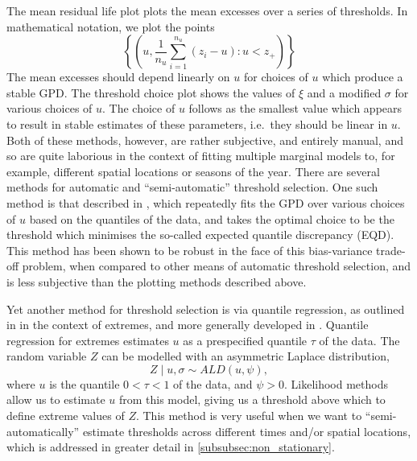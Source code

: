 \documentclass{article}
\numberwithin{equation}{section}
\begin{document}
The mean residual life plot plots the mean excesses over a series of thresholds.
In mathematical notation, we plot the points
\[
  \left\{\left( u, \frac{1}{n_u} \sum_{i=1}^{n_u}{\left(z_i - u\right)}: u < z_{+} \right) \right\} 
\]
The mean excesses should depend linearly on $u$ for choices of $u$ which produce a stable GPD. \cite{Coles2001} 
The threshold choice plot shows the values of $\xi$ and a modified $\sigma$ for various choices of $u$. 
The choice of $u$ follows as the smallest value which appears to result in stable estimates of these parameters, i.e.\ they should be linear in $u$. 
Both of these methods, however, are rather subjective, and entirely manual, and so are quite laborious in the context of fitting multiple marginal models to, for example, different spatial locations or seasons of the year. 
There are several methods for automatic and ``semi-automatic'' threshold selection. 
One such method is that described in \cite{Murphy2024}, which repeatedly fits the GPD over various choices of $u$ based on the quantiles of the data, and takes the optimal choice to be the threshold which minimises the so-called expected quantile discrepancy (EQD).
This method has been shown to be robust in the face of this bias-variance trade-off problem, when compared to other means of automatic threshold selection, and is less subjective than the plotting methods described above. 

Yet another method for threshold selection is via quantile regression, as outlined in \cite{Youngman2019} in the context of extremes, and more generally developed in \cite{Yu2001}. 
Quantile regression for extremes estimates $u$ as a prespecified quantile $\tau$ of the data. 
The random variable $Z$ can be modelled with an asymmetric Laplace distribution,
\begin{equation} \label{eq:asymmetric_laplace}
  Z \mid u, \sigma \sim ALD(u, \psi),
\end{equation}
where $u$ is the quantile $0 < \tau < 1$ of the data, and $\psi > 0$. 
Likelihood methods allow us to estimate $u$ from this model, giving us a threshold above which to define extreme values of $Z$.
This method is very useful when we want to ``semi-automatically'' estimate thresholds across different times and/or spatial locations, which is addressed in greater detail in \ref{subsubsec:non_stationary}.
\end{document}
